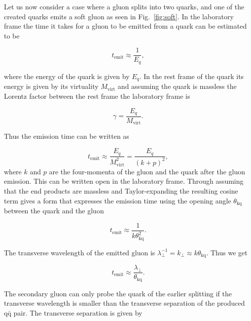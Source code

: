 Let us now consider a case where a gluon splits into two quarks, and one of the created quarks emits a soft gluon as seen in Fig.~\ref{fig:soft}. In the laboratory frame the time it takes for a gluon to be emitted from a quark can be estimated to be~\cite{basicsofpqcd}



\begin{equation}
t_\mathrm{emit} \approx \frac{1}{E_q},
\end{equation}


\noindent where the energy of the quark is given by $E_q$. In the rest frame of the quark its energy is given by its virtuality $M_\mathrm{virt}$ and assuming the quark is massless the Lorentz factor between the rest frame the laboratory frame is 

\begin{equation}
\gamma = \frac{E_q}{M_\mathrm{virt}}.
\end{equation}

\noindent Thus the emission time can be written as

\begin{equation}
t_\mathrm{emit} \approx \frac{E_q}{M_\mathrm{virt}^2}  = \frac{E_q}{\left(k+p\right)^2},
\end{equation}
\noindent where $k$ and $p$ are the four-momenta of the gluon and the quark after the gluon emission. This can be written open in the laboratory frame. Through assuming that the end products are massless and Taylor-expanding the resulting cosine term gives a form that expresses the emission time using the opening angle $\theta_\mathrm{kq}$ between the quark and the gluon


\begin{equation}
t_\mathrm{emit} \approx \frac{1}{k\theta_\mathrm{kq}^2}.
\end{equation}


\noindent The transverse wavelength of the emitted gluon is $\lambda_\perp^{-1}=k_\perp\approx k\theta_\mathrm{kq}$. Thus we get

\begin{equation}
t_\mathrm{emit} \approx \frac{\lambda_\perp}{\theta_\mathrm{kq}}.
\end{equation}

\noindent The secondary gluon can only probe the quark of the earlier splitting if the transverse wavelength is smaller than the transverse separation of the produced $\mathrm{q \bar q}$ pair. The transverse separation is given by

